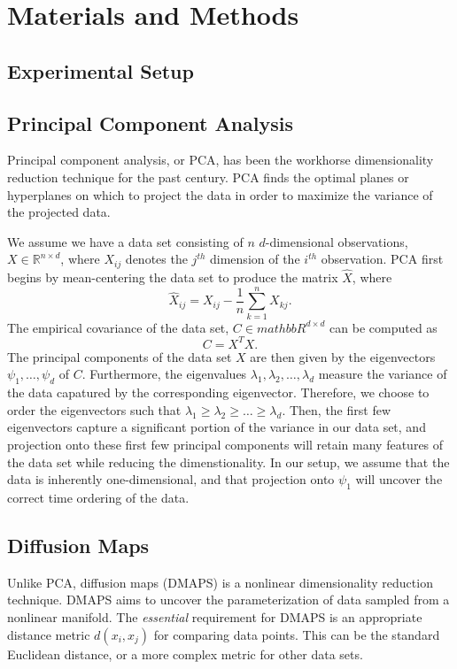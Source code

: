 \documentclass[10pt]{article}
\begin{document}
\section*{Materials and Methods}

\subsection*{Experimental Setup}

\subsection*{Principal Component Analysis}
Principal component analysis, or PCA, has been the workhorse dimensionality reduction technique for the past century.
%
PCA finds the optimal planes or hyperplanes on which to project the data in order to maximize the variance of the projected data.

We assume we have a data set consisting of $n$ $d$-dimensional observations, $X \in \mathbb{R}^{n \times d}$, where $X_{ij}$ denotes the $j^{th}$ dimension of the $i^{th}$ observation. 
%
PCA first begins by mean-centering the data set to produce the matrix $\hat{X}$, where
\begin{equation}
\hat{X}_{ij} = X_{ij} - \frac{1}{n} \sum_{k=1}^n X_{kj}.
\end{equation}
%
The empirical covariance of the data set, $C \in mathbb{R}^{d \times d}$ can be computed as
\begin{equation}
C = X^T X.
\end{equation}
%
The principal components of the data set $X$ are then given by the eigenvectors $\psi_1, \dots, \psi_d$ of $C$.
%
Furthermore, the eigenvalues $\lambda_1, \lambda_2, \dots, \lambda_d$ measure the variance of the data capatured by the corresponding eigenvector. 
%
Therefore, we choose to order the eigenvectors such that $\lambda_1 \ge \lambda_2 \ge \dots \ge \lambda_d$.
%
Then, the first few eigenvectors capture a significant portion of the variance in our data set, and projection onto these first few principal components will retain many features of the data set while reducing the dimenstionality.
%
In our setup, we assume that the data is inherently one-dimensional, and that projection onto $\psi_1$ will uncover the correct time ordering of the data.

\subsection*{Diffusion Maps}
Unlike PCA, diffusion maps (DMAPS) is a nonlinear dimensionality reduction technique. 
%
DMAPS aims to uncover the parameterization of data sampled from a nonlinear manifold.
%
The {\em essential} requirement for DMAPS is an appropriate distance metric $d(x_i, x_j)$ for comparing data points. 
%
This can be the standard Euclidean distance, or a more complex metric for other data sets.
\end{document}
